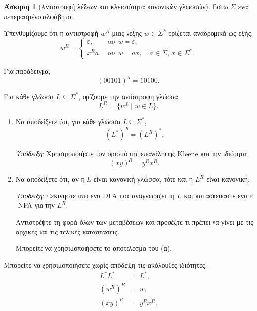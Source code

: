 \documentclass[11pt,a4paper]{article}
\newcommand{\eps}{\varepsilon}
\theoremstyle{definition}
\newtheorem{question}{Άσκηση}
\begin{document}
\begin{question}[Αντιστροφή λέξεων και κλειστότητα κανονικών γλωσσών]

Έστω $\Sigma$ ένα πεπερασμένο αλφάβητο.

Υπενθυμίζουμε ότι η αντιστροφή $w^R$
μιας λέξης $w\in\Sigma^*$ ορίζεται
αναδρομικά ως εξής:
\[
w^R=
\begin{cases}
\eps,
    & \text{αν }w=\eps,\\[2mm]
x^R a,
    & \text{αν }w=ax,\quad
      a\in\Sigma,\ x\in\Sigma^*.
\end{cases}
\]

Για παράδειγμα,
\[
    (00101)^R=10100.
\]

Για κάθε γλώσσα $L\subseteq\Sigma^*$,
ορίζουμε την αντίστροφη γλώσσα
\[
    L^R=\{w^R\mid w\in L\}.
\]

\begin{enumerate}

\item Να αποδείξετε ότι, για κάθε γλώσσα
$L\subseteq\Sigma^*$,
\[
    \boxed{(L^*)^R=(L^R)^*.}
\]

\textit{Υπόδειξη:}
Χρησιμοποιήστε τον ορισμό
της επανάληψης Kleene και την ιδιότητα
\[
    (xy)^R=y^Rx^R.
\]

\item Να αποδείξετε ότι, αν η $L$
είναι κανονική γλώσσα,
τότε και η $L^R$ είναι κανονική.

\textit{Υπόδειξη:}
Ξεκινήστε από ένα DFA που αναγνωρίζει
τη $L$ και κατασκευάστε ένα
$\eps$-NFA για την $L^R$.

Αντιστρέψτε τη φορά όλων των
μεταβάσεων και προσέξτε τι πρέπει
να γίνει με τις αρχικές και
τις τελικές καταστάσεις.

Μπορείτε να χρησιμοποιήσετε
το αποτέλεσμα του (α).

\end{enumerate}

Μπορείτε να χρησιμοποιήσετε
χωρίς απόδειξη τις ακόλουθες ιδιότητες:
\[
\begin{aligned}
L^*L^*&=L^*,\\
(w^R)^R&=w,\\
(xy)^R&=y^Rx^R.
\end{aligned}
\]

\end{question}
\end{document}

